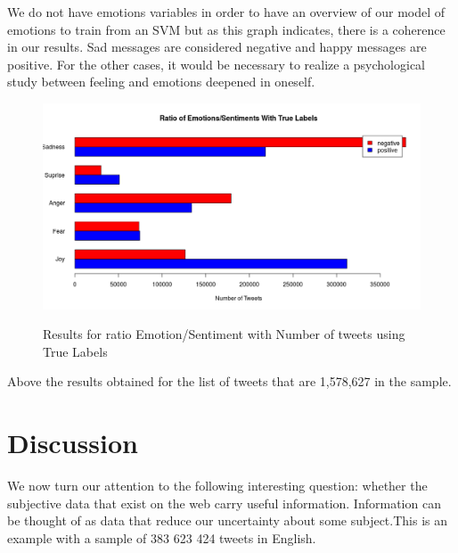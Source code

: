 \documentclass{acmtog} %
\begin{document}
We do not have emotions variables in order to have an overview of our model of emotions to train from an SVM but as this graph indicates, there is a coherence in our results. Sad messages are considered negative and happy messages are positive. For the other cases, it would be necessary to realize a psychological study between feeling and emotions deepened in oneself.


\begin{figure}[h!]
{\includegraphics[width=\linewidth]{ratio-true-labels.png}}
\caption{Results for ratio Emotion/Sentiment with Number of tweets using True Labels}
  \label{fig:contradiction_barplot}
\end{figure}

\begin{table}[H]
\label{tab:cross_tab_TrueLabels}
\end{table}



Above the results obtained for the list of tweets that are 1,578,627 in the sample.


\section{Discussion}
\label{sec:discussion}

We now turn our attention to the following interesting question: whether the subjective data that exist on the web carry useful information. Information can be thought of as data that reduce our uncertainty about some subject.This is an example with a sample of 383 623 424 tweets in English.
\end{document}
